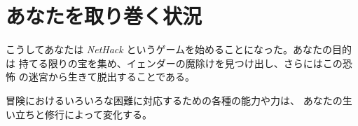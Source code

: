 \section{あなたを取り巻く状況}

こうしてあなたは {\it NetHack\/} というゲームを始めることになった。あなたの目的は
持てる限りの宝を集め、イェンダーの魔除けを見つけ出し、さらにはこの恐怖
の迷宮から生きて脱出することである。

冒険におけるいろいろな困難に対応するための各種の能力や力は、
あなたの生い立ちと修行によって変化する。

